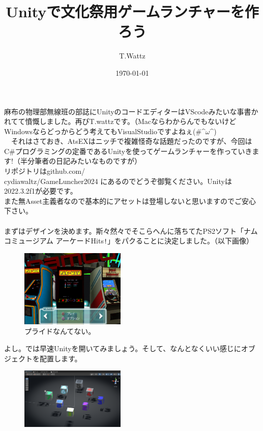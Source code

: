 \documentclass[b5paper,9pt,platex,dvipdfmx]{jsarticle}
\begin{document}
\title{Unityで文化祭用ゲームランチャーを作ろう}
\author{T.Wattz}
\date{\today}
\maketitle
\thispagestyle{empty}

\begin{multicols*}{3}

麻布の物理部無線班の部誌にUnityのコードエディターはVScodeみたいな事書かれてて憤慨しました。再びT.wattzです。（MacならわからんでもないけどWindowsならどっからどう考えてもVisualStudioですよねぇ(\#\textasciicircum$ \omega$\textasciicircum)\\
　それはさておき、AtsEXはニッチで複雑怪奇な話題だったのですが、今回はC\#プログラミングの定番であるUnityを使ってゲームランチャーを作っていきます!（半分筆者の日記みたいなものですが）\\
リポジトリはgithub.com/\\
cydiawaltz/GameLuncher2024 にあるのでどうぞ御覧ください。Unityは2022.3.2f1が必要です。\\
また無Asset主義者なので基本的にアセットは登場しないと思いますのでご安心下さい。\\
\\
まずはデザインを決めます。斯々然々でそこらへんに落ちてたPS2ソフト「ナムコミュージアム アーケードHits\verb|!|」をパクることに決定しました。（以下画像）\\
\begin{figure}[H]
  \centering
  \includegraphics[width=5cm]{1.png}
  \caption{プライドなんてない。}
\end{figure}
よし。では早速Unityを開いてみましょう。そして、なんとなくいい感じにオブジェクトを配置します。\\
\begin{figure}[H]
  \centering
  \includegraphics[width=5cm]{2.png}

\end{figure}
\end{multicols*}
\end{document}
